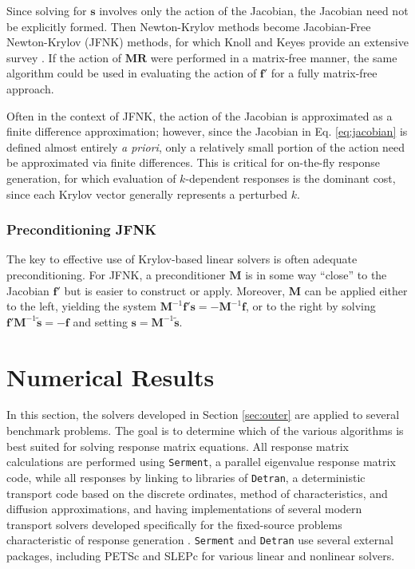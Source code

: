Since solving for $\mathbf{s}$ involves only the action of the 
Jacobian, the Jacobian need not be explicitly formed.  Then 
Newton-Krylov methods become  Jacobian-Free Newton-Krylov (JFNK) 
methods, for which Knoll and Keyes provide an extensive survey 
\cite{knoll2004jfn}.  If the action of $\mathbf{MR}$ were performed 
in a matrix-free 
manner, the same algorithm could be used in evaluating the 
action of $\mathbf{f}'$ for a fully matrix-free approach.

Often in the context of JFNK, the action 
of the Jacobian is approximated as a finite difference 
approximation; however, since the Jacobian in Eq. \ref{eq:jacobian} 
is defined almost entirely {\it a priori}, only a relatively small 
portion of the action need be approximated via finite differences.  
This is critical for on-the-fly response generation, for which
evaluation of $k$-dependent responses is the dominant cost, since
each Krylov vector generally represents a perturbed $k$.

\subsubsection{Preconditioning JFNK}

The key to effective use of Krylov-based linear solvers is often 
adequate preconditioning.  For JFNK, a preconditioner $\mathbf{M}$ is 
in some way ``close'' to the Jacobian $\mathbf{f}'$ but is easier to 
construct or apply.  Moreover, $\mathbf{M}$ can be applied either 
to the left, yielding the 
system $\mathbf{M}^{-1}\mathbf{f}'\mathbf{s}=-\mathbf{M}^{-1}\mathbf{f}$, or 
to the right by solving 
$\mathbf{f}' \mathbf{M}^{-1} \tilde{\mathbf{s}} = -\mathbf{f}$ and 
setting $\mathbf{s} =  \mathbf{M}^{-1} \tilde{\mathbf{s}} $.

\section{Numerical Results}
\label{sec:results}


In this section, the solvers developed in 
Section \ref{sec:outer} are applied to several benchmark
problems.  The goal is to determine
which of the various algorithms is best suited for solving 
response matrix equations.  All response matrix calculations are performed 
using {\tt Serment}, a parallel eigenvalue response matrix code,
while all responses by linking to libraries of {\tt Detran}, a deterministic 
transport code based on the discrete ordinates, method of characteristics, 
and diffusion approximations, and having implementations of 
several modern transport solvers developed specifically 
for the fixed-source problems characteristic of 
response generation \cite{detran}.  {\tt Serment} and {\tt Detran} use 
several external packages, including PETSc \cite{petsc} and 
SLEPc \cite{slepc} for various linear and nonlinear solvers.

